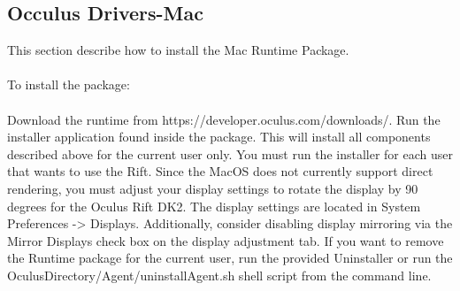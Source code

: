 \subsection{Occulus Drivers-Mac}

This section describe how to install the Mac Runtime Package.
\\
\\
To install the package:
\\
\\
Download the runtime from https://developer.oculus.com/downloads/. Run the installer application found inside the package. This will install all components described above for the current user only. You must run the installer for each user that wants to use the Rift.
Since the MacOS does not currently support direct rendering, you must adjust your display settings to rotate the display by 90 degrees for the Oculus Rift DK2. The display settings are located in System Preferences -> Displays. Additionally, consider disabling display mirroring via the Mirror Displays check box on the display adjustment tab.
If you want to remove the Runtime package for the current user, run the provided Uninstaller or run the OculusDirectory/Agent/uninstallAgent.sh shell script from the command line.

